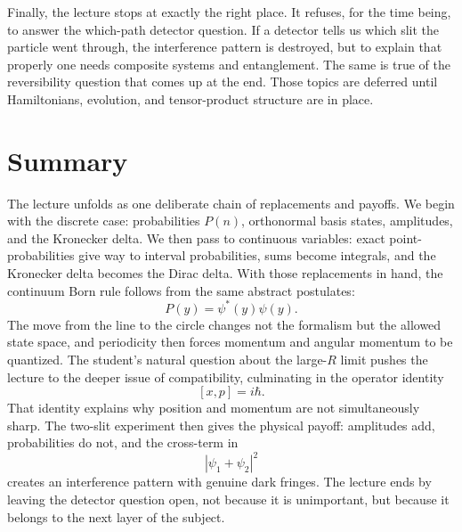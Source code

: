 Finally, the lecture stops at exactly the right place. It refuses, for the time being, to answer the which-path detector question. If a detector tells us which slit the particle went through, the interference pattern is destroyed, but to explain that properly one needs composite systems and entanglement. The same is true of the reversibility question that comes up at the end. Those topics are deferred until Hamiltonians, evolution, and tensor-product structure are in place.

\section{Summary}

The lecture unfolds as one deliberate chain of replacements and payoffs. We begin with the discrete case: probabilities \(P(n)\), orthonormal basis states, amplitudes, and the Kronecker delta. We then pass to continuous variables: exact point-probabilities give way to interval probabilities, sums become integrals, and the Kronecker delta becomes the Dirac delta. With those replacements in hand, the continuum Born rule follows from the same abstract postulates:
\[
P(y)=\psi^*(y)\psi(y).
\]
The move from the line to the circle changes not the formalism but the allowed state space, and periodicity then forces momentum and angular momentum to be quantized. The student's natural question about the large-\(R\) limit pushes the lecture to the deeper issue of compatibility, culminating in the operator identity
\[
[x,p]=i\hbar.
\]
That identity explains why position and momentum are not simultaneously sharp. The two-slit experiment then gives the physical payoff: amplitudes add, probabilities do not, and the cross-term in
\[
|\psi_1+\psi_2|^2
\]
creates an interference pattern with genuine dark fringes. The lecture ends by leaving the detector question open, not because it is unimportant, but because it belongs to the next layer of the subject.